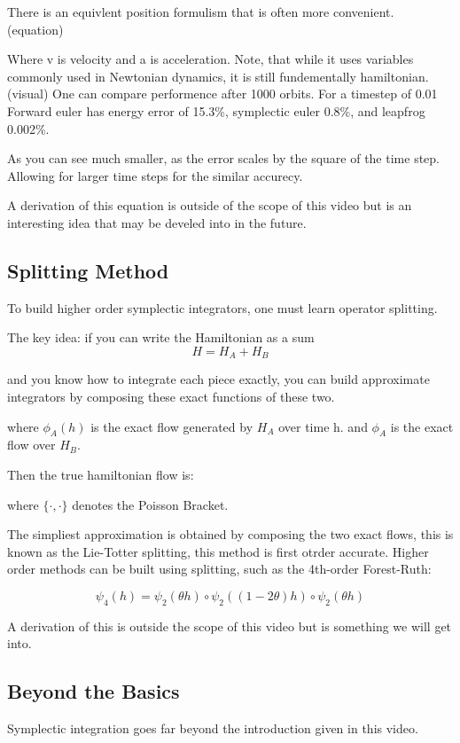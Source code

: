 There is an equivlent position formulism that is often more convenient.
(equation)

Where v is velocity and a is acceleration. Note, that while it uses variables commonly used in Newtonian dynamics, it is still fundementally hamiltonian.
(visual)
One can compare performence after 1000 orbits. For a timestep of 0.01 Forward euler has energy error of 15.3\%, symplectic euler 0.8\%, and leapfrog 0.002\%.

As you can see much smaller, as the error scales by the square of the time step. Allowing for larger time steps for the similar accurecy.

A derivation of this equation is outside of the scope of this video but is an interesting idea that may be develed into in the future.

\subsection{Splitting Method}

To build higher order symplectic integrators, one must learn operator splitting.

The key idea: if you can write the Hamiltonian as a sum
\[
	H=H_A + H_B
\]

and you know how to integrate each piece exactly, you can build approximate integrators by composing these exact functions of these two.

where $\phi_A(h)$ is the exact flow generated by $H_A$ over time h.
and $\phi_A$ is the exact flow over $H_B$.

Then the true hamiltonian flow is:







where $\{\cdot, \cdot \}$ denotes the Poisson Bracket.

The simpliest approximation is obtained by composing the two exact flows, this is known as the Lie-Totter splitting, this method is first otrder accurate. Higher order methods can be built using splitting, such as the 4th-order Forest-Ruth:

\[
	\psi_4(h)=\psi_2(\theta h) \circ \psi_2((1-2 \theta)h) \circ \psi_2(\theta h)
\]

A derivation of this is outside the scope of this video but is something we will get into.

\subsection{Beyond the Basics}
Symplectic integration goes far beyond the introduction given in this video.

